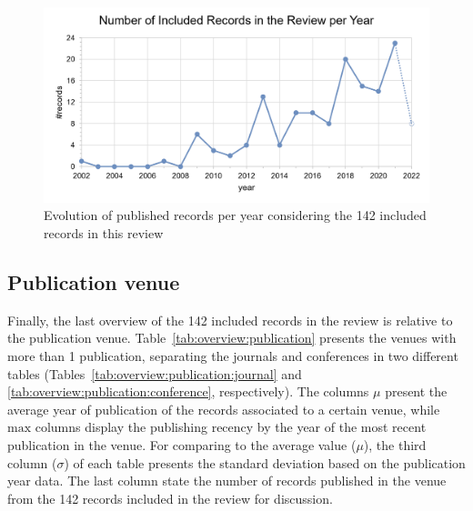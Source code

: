 \begin{figure}[!t]
  \centering
  \includegraphics[width=\columnwidth]{figures/year.png}
  \caption{Evolution of published records per year considering the 142 included records in this review}
  \label{fig:overview:year}
\end{figure}

\subsection{Publication venue}
\label{sec:overview:publication}

Finally, the last overview of the 142 included records in the review is relative to the publication venue. Table~\ref{tab:overview:publication} presents the venues with more than 1 publication, separating the journals and conferences in two different tables (Tables~\ref{tab:overview:publication:journal} and \ref{tab:overview:publication:conference}, respectively).
The columns $\mu$ present the average year of publication of the records associated to a certain venue, while $\text{max}$ columns display the publishing recency by the year of the most recent publication in the venue. For comparing to the average value ($\mu$), the third column ($\sigma$) of each table presents the standard deviation based on the publication year data.
The last column state the number of records published in the venue from the 142 records included in the review for discussion.

